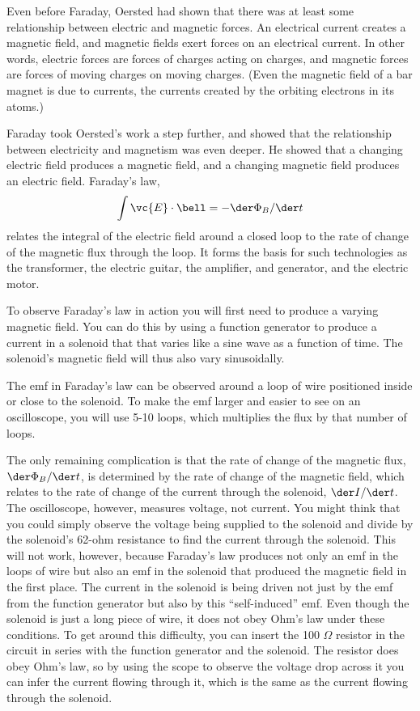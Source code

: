 Even before Faraday, Oersted had shown that there was at
least some relationship between electric and magnetic
forces. An electrical current creates a magnetic field, and
magnetic fields exert forces on an electrical current. In
other words, electric forces are forces of charges acting on
charges, and magnetic forces are forces of moving charges on
moving charges. (Even the magnetic field of a bar magnet is
due to currents, the currents created by the orbiting
electrons in its atoms.)

Faraday took Oersted's work a step further, and showed that
the relationship between electricity and magnetism was even
deeper. He showed that a changing electric field produces a
magnetic field, and a changing magnetic field produces an
electric field. Faraday's law,
\begin{equation*}
      \int \vc{E}\cdot\bell  =  -\der\Phi_B/\der t  
\end{equation*}
relates the integral of the electric field around a
closed loop to the rate of change of the magnetic flux
through the loop. It forms the basis for such technologies
as the transformer, the electric guitar, the amplifier, and
generator, and the electric motor.

\observations


To observe Faraday's law in action you will first need to
produce a varying magnetic field. You can do this by using a
function generator to produce a current in a solenoid that
that varies like a sine wave as a function of time. The
solenoid's magnetic field will thus also vary sinusoidally.

The emf  in Faraday's law can be observed around a loop of
wire positioned inside or close to the solenoid. To make the
emf larger and easier to see on an oscilloscope, you will
use 5-10 loops, which multiplies the flux by that number of
loops.

The only remaining complication is that the rate of change
of the magnetic flux, $\der \Phi_B/\der t$,
is determined by the rate of change
of the magnetic field, which relates to the rate of change
of the current through the solenoid, $\der I/\der t$. The oscilloscope,
however, measures voltage, not current. You might think that
you could simply observe the voltage being supplied to the
solenoid and divide by the solenoid's 62-ohm resistance to
find the current through the solenoid. This will not work,
however, because Faraday's law produces not only an emf in
the loops of wire but also an emf in the solenoid that
produced the magnetic field in the first place. The current
in the solenoid is being driven not just by the emf from the
function generator but also by this ``self-induced'' emf.
Even though the solenoid is just a long piece of wire, it
does not obey Ohm's law under these conditions. To get
around this difficulty, you can insert the 100 $\Omega$
resistor in the circuit in series with the function
generator and the solenoid. The resistor does obey Ohm's law, so by
using the scope to observe the voltage drop across it you
can infer the current flowing through it, which is the same
as the current flowing through the solenoid.

